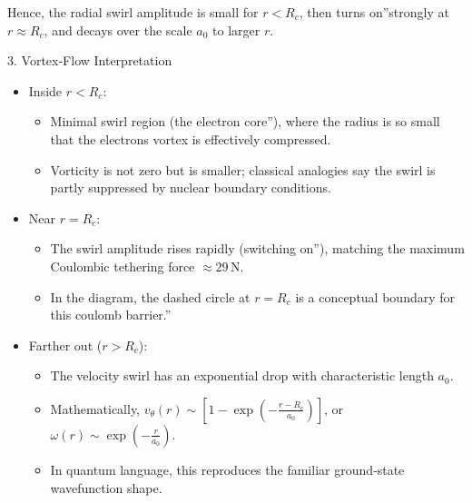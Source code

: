 Hence, the radial swirl amplitude is small for \(r < R_c\), then \grqq turns on\textquotedblright strongly at \(r \approx R_c\), and decays over the scale \(a_0\) to larger \(r\).

3. Vortex‐Flow Interpretation

\begin{itemize}
    \item Inside \(r < R_c\):

        \begin{itemize}
            \item Minimal swirl region (the \grqq electron core\textquotedblright), where the radius is so small that the electron\rqs s vortex is effectively compressed.

            \item Vorticity is not zero but is smaller; classical analogies say the swirl is partly suppressed by nuclear boundary conditions.
        \end{itemize}

    \item Near \(r = R_c\):

        \begin{itemize}
            \item The swirl amplitude rises rapidly (\grqq switching on\textquotedblright), matching the maximum Coulombic tethering force \(\approx 29\,\mathrm{N}\).

            \item In the diagram, the dashed circle at \(r = R_c\) is a conceptual boundary for this \grqq coulomb barrier.\textquotedblright
        \end{itemize}

    \item Farther out (\(r > R_c\)):

    \begin{itemize}
        \item The velocity swirl has an exponential drop with characteristic length \(a_0\).

        \item Mathematically, \(v_\theta(r) \sim [1 - \exp(-\frac{r - R_c}{a_0})]\), or \(\omega(r) \sim \exp(-\frac{r}{a_0})\).

        \item In quantum language, this reproduces the familiar ground‐state wavefunction shape.
    \end{itemize}
\end{itemize}




